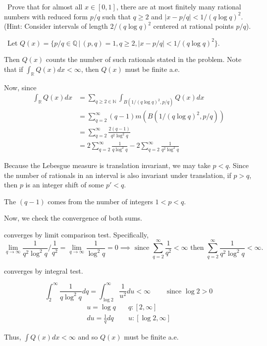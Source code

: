 \documentclass[12pt]{Homework}
\begin{document}
\begin{problem} $\,$
Prove that for almost all $x\in[0,1]$, there are at most finitely many rational numbers with reduced form $p/q$ such that $q\ge 2$ and $|x-p/q|<1/(q\log q)^2$. (Hint: Consider intervals of length $2/(q\log q)^2$ centered at rational points $p/q$).
\end{problem}


\begin{solution}$\,$
Let $Q(x)=\{p/q\in\mathbb{Q}\,|\,(p,q)=1,q\ge 2, |x-p/q|<1/(q\log q)^2\}$.

Then $Q(x)$ counts the number of such rationals stated in the problem. 
Note that if $\int_\mathbb{R}Q(x)dx<\infty$, then $Q(x)$ must be finite a.e.

Now, since \begin{align*}
    \int_\mathbb{R}Q(x)dx&=\sum_{q\ge 2\in\mathbb{N}}\int_{B(1/(q\log q)^2,p/q)}Q(x)dx\\
    &=\sum_{q=2}^\infty(q-1)m(B(1/(q\log q)^2,p/q)) \tag{1}\\
    &=\sum_{q=2}^\infty\frac{2(q-1)}{q^2\log^2q}\\
    &=2\sum_{q=2}^\infty\frac{1}{q\log^2q}-2\sum_{q=2}^\infty\frac{1}{q^2\log^2q}
\end{align*}

 Because the Lebesgue measure is translation invariant, we may take $p<q$. Since the number of rationals in an interval is also invariant under translation, if $p>q$, then $p$ is an integer shift of some $p'<q$. 

The $(q-1)$ comes from the number of integers $1<p<q$.

Now, we check the convergence of both sums. 

 converges by limit comparison test. Specifically, $$\lim_{q\to\infty}\frac{1}{q^2\log^2q}/\frac{1}{q^2}=\lim_{q\to\infty}\frac{1}{\log^2q}=0\implies\text{ since }\sum_{q=2}^\infty\frac{1}{q^2}<\infty\text{ then }\sum_{q=2}^\infty\frac{1}{q^2\log^2q}<\infty.$$

 converges by integral test. 

$$\int_2^\infty\frac{1}{q\log^2q}dq=\int_{\log2}^\infty\frac{1}{u^2}du<\infty\qquad\text{ since }\log2>0$$
\[
\begin{matrix}
    u=\log q & \quad  q:[2,\infty]\\
    du=\frac{1}{q}dq & \quad u:[\log2,\infty]
\end{matrix}
\]

Thus, $\int Q(x)dx<\infty$ and so $Q(x)$ must be finite a.e.
\end{solution}
\newpage
\end{document}
